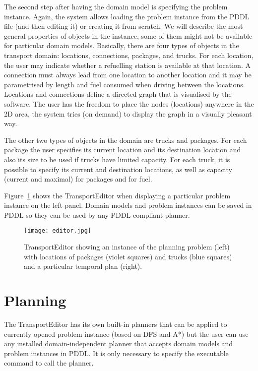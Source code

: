 \documentclass[letterpaper]{article}
\begin{document}
The second step after having the domain model is specifying the problem instance. Again, the system allows loading the problem instance from the PDDL file (and then editing it) or creating it from scratch. We will describe the most general properties of objects in the instance, some of them might not be available for particular domain models. Basically, there are four types of objects in the transport domain: locations, connections, packages, and trucks. For each location, the user may indicate whether a refuelling station is available at that location. A connection must always lead from one location to another location and it may be parametrised by length and fuel consumed when driving between the locations. Locations and connections define a directed graph that is visualised by the software. The user has the freedom to place the nodes (locations) anywhere in the 2D area, the system tries (on demand) to display the graph in a visually pleasant way.

The other two types of objects in the domain are trucks and packages. For each package the user specifies its current location and its destination location and also its size to be used if trucks have limited capacity. For each truck, it is possible to specify its current and destination locations, as well as capacity (current and maximal) for packages and for fuel.

Figure~\ref{fig:editor} shows the TransportEditor when displaying a particular problem instance on the left panel. Domain models and problem instances can be saved in PDDL so they can be used by any PDDL-compliant planner.

\begin{figure}[t]
        \centering
        \texttt{[image: editor.jpg]}
        \caption{TransportEditor showing an instance of the planning problem (left) with locations of packages (violet squares)  and trucks (blue squares) and a particular temporal plan (right).}
    \label{fig:editor}
\end{figure}

\section{Planning}
The TransportEditor has its own built-in planners that can be applied to currently opened problem instance (based on DFS and A*) but the user can use any installed domain-independent planner that accepts domain models and problem instances in PDDL. It is only necessary to specify the executable command to call the planner.
\end{document}
